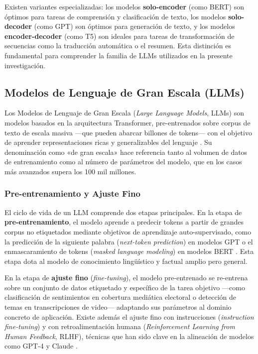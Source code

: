 Existen variantes especializadas: los modelos \textbf{solo-encoder} (como BERT) son óptimos para tareas de comprensión y clasificación de texto, los modelos \textbf{solo-decoder} (como GPT) son óptimos para generación de texto, y los modelos \textbf{encoder-decoder} (como T5) son ideales para tareas de transformación de secuencias como la traducción automática o el resumen. Esta distinción es fundamental para comprender la familia de LLMs utilizados en la presente investigación.

\subsection{Modelos de Lenguaje de Gran Escala (LLMs)}

Los Modelos de Lenguaje de Gran Escala (\textit{Large Language Models}, LLMs) son modelos basados en la arquitectura Transformer, pre-entrenados sobre corpus de texto de escala masiva —que pueden abarcar billones de tokens— con el objetivo de aprender representaciones ricas y generalizables del lenguaje \parencite{bk_russell2009intart}. Su denominación como «de gran escala» hace referencia tanto al volumen de datos de entrenamiento como al número de parámetros del modelo, que en los casos más avanzados supera los 100 mil millones.

\subsubsection{Pre-entrenamiento y Ajuste Fino}

El ciclo de vida de un LLM comprende dos etapas principales. En la etapa de \textbf{pre-entrenamiento}, el modelo aprende a predecir tokens a partir de grandes corpus no etiquetados mediante objetivos de aprendizaje auto-supervisado, como la predicción de la siguiente palabra (\textit{next-token prediction}) en modelos GPT o el enmascaramiento de tokens (\textit{masked language modeling}) en modelos BERT \parencite{tec_devlin2018bert}. Esta etapa dota al modelo de conocimiento lingüístico y factual amplio pero general.

En la etapa de \textbf{ajuste fino} (\textit{fine-tuning}), el modelo pre-entrenado se re-entrena sobre un conjunto de datos etiquetado y específico de la tarea objetivo —como clasificación de sentimientos en cobertura mediática electoral o detección de temas en transcripciones de video— adaptando sus parámetros al dominio concreto de aplicación. Existe además el ajuste fino con instrucciones (\textit{instruction fine-tuning}) y con retroalimentación humana (\textit{Reinforcement Learning from Human Feedback}, RLHF), técnicas que han sido clave en la alineación de modelos como GPT-4 y Claude \parencite{tec_ouyang2022instructgpt}.

